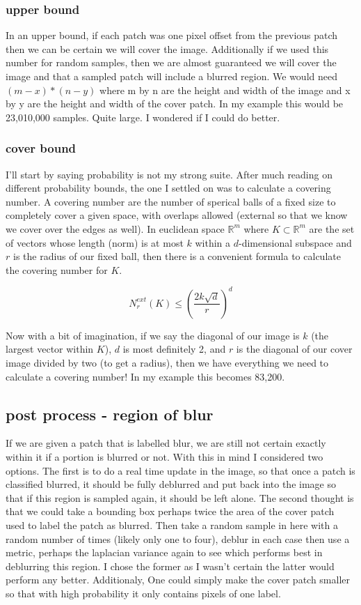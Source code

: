 \documentclass[11pt]{article}
\begin{document}
\subsubsection*{upper bound}

In an upper bound, if each patch was one pixel offset from the previous patch
then we can be certain we will cover the image. Additionally if we used this
number for random samples, then we are almost guaranteed we will cover the image
and that a sampled patch will include a blurred region. We would need
$(m-x) * (n-y)$ where m by n are the height and width of the image and x by y
are the height and width of the cover patch. In my example this would be
23,010,000 samples. Quite large. I wondered if I could do better.


\subsubsection*{cover bound}

I'll start by saying probability is not my strong suite. After much reading on
different probability bounds, the one I settled on was to calculate a covering number.
A covering number are the number of sperical balls of a fixed size to completely cover
a given space, with overlaps allowed (external so that we know we cover over the edges
as well). In euclidean space $\mathbb{R}^m$ where
$K \subset \mathbb{R}^m$ are the set of vectors whose length (norm) is at most $k$
within a $d$-dimensional subspace and $r$ is the radius of our fixed ball, then there
is a convenient formula to calculate the covering number for $K$.

\[
 N^{ext}_{r} (K) \leq ( \frac{2k \sqrt{d}} {r} )^d
\]

Now with a bit of imagination, if we say the diagonal of our image is $k$ (the largest
vector within $K$), $d$ is most definitely 2, and $r$ is the diagonal of our cover
image divided by two (to get a radius), then we have everything we need to calculate
a covering number! In my example this becomes 83,200.

\subsection*{post process - region of blur}

If we are given a patch that is labelled blur, we are still not certain exactly within
it if a portion is blurred or not. With this in mind I considered two options.
The first is to do a real time update in the image, so that once a patch is classified
blurred, it should be fully deblurred and put back into the image so that if this
region is sampled again, it should be left alone. The second thought is that we could
take a bounding box perhaps twice the area of the cover patch used to label the patch
as blurred. Then take a random sample in here with a random number of times (likely only
one to four), deblur in each case then use a metric, perhaps the laplacian variance again
to see which performs best in deblurring this region. I chose the former as I wasn't
certain the latter would perform any better. Additionaly, One could simply make the
cover patch smaller so that with high probability it only contains pixels of one label.
\end{document}
